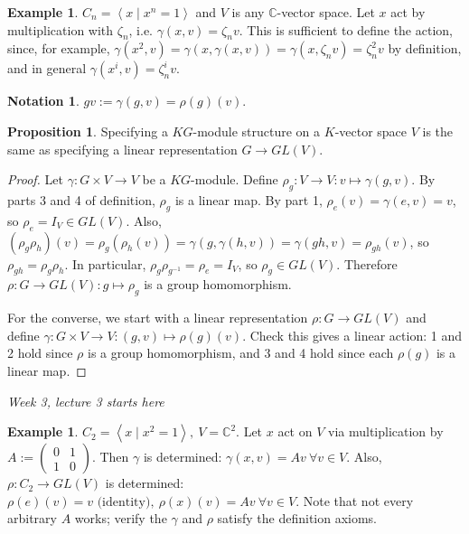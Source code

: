 \documentclass{article}
\newcommand{\la}{\left\langle}
\newcommand{\ra}{\right\rangle}
\newcommand{\C}{\mathbb{C}}
\theoremstyle{definition}
\newtheorem{prop}[defn]{Proposition}
\newtheorem{example}[defn]{Example}
\newtheorem*{notation}{Notation}
\begin{document}
\begin{example}
$C_n=\la x\mid x^n=1\ra$ and $V$ is any $\C$-vector space. Let $x$ act by multiplication with $\zeta_n$, i.e. $\gamma(x,v)=\zeta_nv$. This is sufficient to define the action, since, for example, $\gamma(x^2,v)=\gamma(x,\gamma(x,v))=\gamma(x,\zeta_nv)=\zeta_n^2v$ by definition, and in general $\gamma(x^i,v)=\zeta_n^i v$.
\end{example}

\begin{notation}
$gv:=\gamma(g,v)=\rho(g)(v)$.
\end{notation}

\begin{prop}
Specifying a $KG$-module structure on a $K$-vector space $V$ is the same as specifying a linear representation $G\rightarrow GL(V)$.
\end{prop}
\begin{proof}
Let $\gamma:G\times V\rightarrow V$ be a $KG$-module. Define $\rho_g:V\rightarrow V:v\mapsto \gamma(g,v)$. By parts 3 and 4 of definition, $\rho_g$ is a linear map. By part 1, $\rho_e(v)=\gamma(e,v)=v$, so $\rho_e=I_V\in GL(V)$. Also, $(\rho_g \rho_h)(v)=\rho_g(\rho_h(v))=\gamma(g,\gamma(h,v))=\gamma(gh,v)=\rho_{gh}(v)$, so $\rho_{gh}=\rho_g\rho_h$. In particular, $\rho_g\rho_{g^{-1}}=\rho_e=I_V$, so $\rho_g\in GL(V)$. Therefore $\rho:G\rightarrow GL(V):g\mapsto \rho_g$ is a group homomorphism.

For the converse, we start with a linear representation $\rho:G\rightarrow GL(V)$ and define $\gamma:G\times V\rightarrow V:(g,v)\mapsto \rho(g)(v)$. Check this gives a linear action: 1 and 2 hold since $\rho$ is a group homomorphism, and 3 and 4 hold since each $\rho(g)$ is a linear map.
\end{proof}

\begin{flushright}
\textit{Week 3, lecture 3 starts here}
\end{flushright}

\begin{example}
$C_2=\la x\mid x^2=1\ra,\ V=\C^2$. Let $x$ act on $V$ via multiplication by $A:=\begin{pmatrix}0&1\\1&0\end{pmatrix}$. Then $\gamma$ is determined: $\gamma(x,v)=Av\ \forall v\in V$. Also, $\rho:C_2\rightarrow GL(V)$ is determined: $\rho(e)(v)=v \text{ (identity)},\ \rho(x)(v)=Av \ \forall v\in V$. Note that not every arbitrary $A$ works; verify the $\gamma$ and $\rho$ satisfy the definition axioms.
\end{example}
\end{document}
